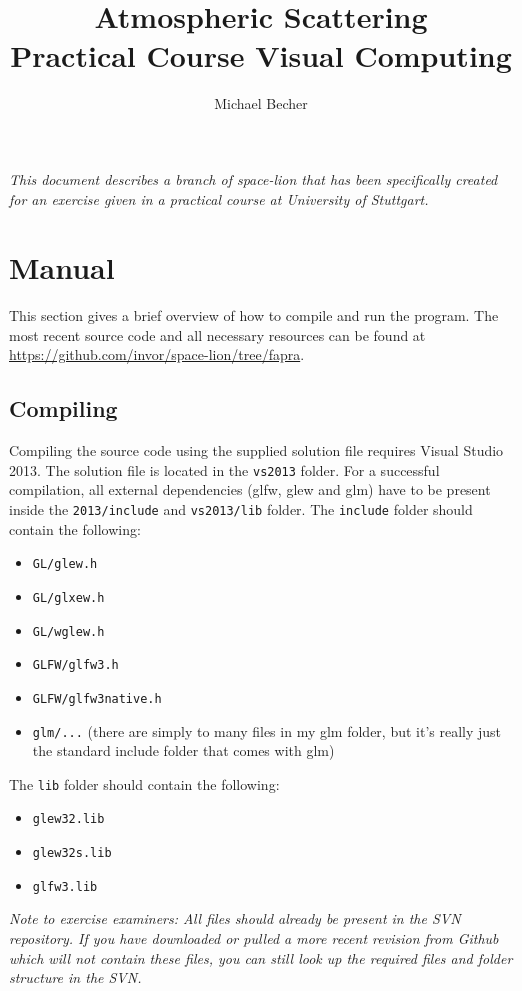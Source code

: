 \documentclass[12pt]{article}
\title{
	Atmospheric Scattering \\ 
	Practical Course Visual Computing
}
\author{
	Michael Becher \\
}
\date{}
\begin{document}
\maketitle
\textit{This document describes a branch of space-lion that has been specifically created for an exercise given in a practical course at University of Stuttgart. }
\section*{Manual}
This section gives a brief overview of how to compile and run the program. The most recent source code and all necessary resources can be found at \url{https://github.com/invor/space-lion/tree/fapra}.
\subsection*{Compiling}
Compiling the source code using the supplied solution file requires Visual Studio 2013. The solution file is located in the \texttt{vs2013} folder.
For a successful compilation, all external dependencies (glfw, glew and glm) have to be present inside the \texttt{2013/include} and \texttt{vs2013/lib} folder. The \texttt{include} folder should contain the following:
\begin{itemize}
\item \texttt{GL/glew.h}
\item \texttt{GL/glxew.h}
\item \texttt{GL/wglew.h}
\item \texttt{GLFW/glfw3.h}
\item \texttt{GLFW/glfw3native.h}
\item \texttt{glm/...} \newline (there are simply to many files in my glm folder, but it's really just the standard include folder that comes with glm)
\end{itemize}
The \texttt{lib} folder should contain the following:
\begin{itemize}
\item \texttt{glew32.lib}
\item \texttt{glew32s.lib}
\item \texttt{glfw3.lib}
\end{itemize}
\textit{Note to exercise examiners:\newline
All files should already be present in the SVN repository. If you have downloaded or pulled a more recent revision from Github which will not contain these files, you can still look up the required files and folder structure in the SVN.}
\end{document}
